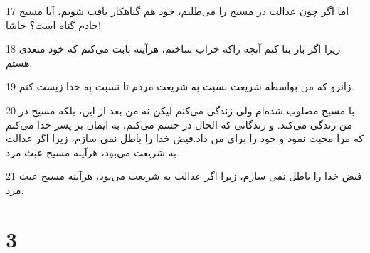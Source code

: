 \par 17 اما اگر چون عدالت در مسیح را می‌طلبم، خود هم گناهکار یافت شویم، آیا مسیح خادم گناه است؟ حاشا!
\par 18 زیرا اگر باز بنا کنم آنچه راکه خراب ساختم، هرآینه ثابت می‌کنم که خود متعدی هستم.
\par 19 زانرو که من بواسطه شریعت نسبت به شریعت مردم تا نسبت به خدا زیست کنم.
\par 20 با مسیح مصلوب شده‌ام ولی زندگی می‌کنم لیکن نه من بعد از این، بلکه مسیح در من زندگی می‌کند. و زندگانی که الحال در جسم می‌کنم، به ایمان بر پسر خدا می‌کنم که مرا محبت نمود و خود را برای من داد.فیض خدا را باطل نمی سازم، زیرا اگر عدالت به شریعت می‌بود، هرآینه مسیح عبث مرد.
\par 21 فیض خدا را باطل نمی سازم، زیرا اگر عدالت به شریعت می‌بود، هرآینه مسیح عبث مرد.

\chapter{3}

